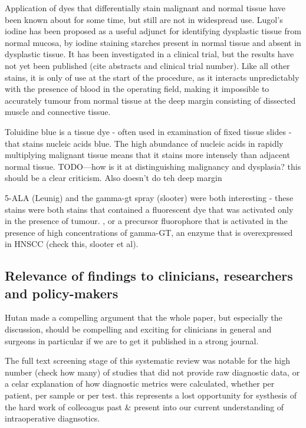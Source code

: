 Application of dyes that differentially stain malignant and normal tissue have been known about for some time, but still are not in widespread use.
Lugol's iodine has been proposed as a useful adjunct for identifying dysplastic tissue from normal mucosa, by iodine staining starches present in normal tissue and absent in dysplastic tissue.
It has been investigated in a clinical trial, but the results have not yet been published (cite abstracts and clinical trial number).
Like all other stains, it is only of use at the start of the procedure, as it interacts unpredictably with the presence of blood in the operating field, making it impossible to accurately tumour from normal tissue at the deep margin consisting of dissected muscle and connective tissue.

Toluidine blue is a tissue dye - often used in examination of fixed tissue slides - that stains nucleic acids blue.
The high abundance of nucleic acids in rapidly multiplying malignant tissue means that it stains more intensely than adjacent normal tissue.
TODO---how is it at distinguishing malignancy and dysplasia? this should be a clear criticism. 
Also doesn't do teh deep margin

5-ALA (Leunig) and the gamma-gt spray (slooter) were both interesting - these stains were both stains that contained a fluorescent dye that was activated only in the presence of tumour. 
, or a precursor fluorophore that is activated in the presence of high concentrations of gamma-GT, an enzyme that is overexpressed in HNSCC (check this, slooter et al).

\subsection{Relevance of findings to clinicians, researchers and policy-makers}

Hutan made a compelling argument that the whole paper, but especially the discussion, should be compelling and exciting for clinicians in general and surgeons in particular if we are to get it published in a strong journal.

The full text screening stage of this systematic review was notable for the high number (check how many) of studies that did not provide raw diagnostic data, or a celar explanation of how diagnostic metrics were calculated, whether per patient, per sample or per test.
this represents a lost opportunity for systhesis of the hard work of colleoagus past \& present into our current understanding of intraoperative diagnsotics.

